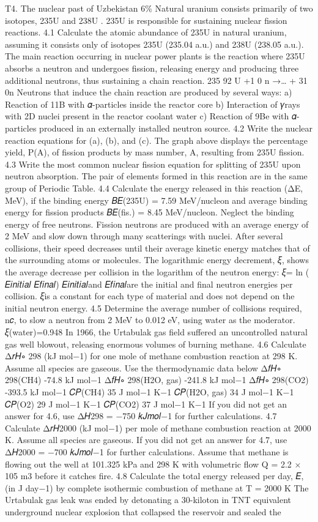 T4. The nuclear past of Uzbekistan 6\% Natural uranium consists primarily of two isotopes, 235U and 238U . 235U is responsible for sustaining nuclear fission reactions. 4.1 Calculate the atomic abundance of 235U in natural uranium, assuming it consists only of isotopes 235U (235.04 a.u.) and 238U (238.05 a.u.). The main reaction occurring in nuclear power plants is the reaction where 235U absorbs a neutron and undergoes fission, releasing energy and producing three additional neutrons, thus sustaining a chain reaction. 235 92 U +1 0 n →… + 31 0n Neutrons that induce the chain reaction are produced by several ways: a) Reaction of 11B with 𝛼-particles inside the reactor core b) Interaction of 𝛾rays with 2D nuclei present in the reactor coolant water c) Reaction of 9Be with 𝛼-particles produced in an externally installed neutron source. 4.2 Write the nuclear reaction equations for (a), (b), and (c). The graph above displays the percentage yield, P(A), of fission products by mass number, A, resulting from 235U fission. 4.3 Write the most common nuclear fission equation for splitting of 235U upon neutron absorption. The pair of elements formed in this reaction are in the same group of Periodic Table. 4.4 Calculate the energy released in this reaction (ΔE, MeV), if the binding energy 𝐵𝐸(235U) = 7.59 MeV/nucleon and average binding energy for fission products 𝐵𝐸(fis.) = 8.45 MeV/nucleon. Neglect the binding energy of free neutrons. Fission neutrons are produced with an average energy of 2 MeV and slow down through many scatterings with nuclei. After several collisions, their speed decreases until their average kinetic energy matches that of the surrounding atoms or molecules. The logarithmic energy decrement, 𝜉, shows the average decrease per collision in the logarithm of the neutron energy: 𝜉= ln ( 𝐸𝑖𝑛𝑖𝑡𝑖𝑎𝑙 𝐸𝑓𝑖𝑛𝑎𝑙) 𝐸𝑖𝑛𝑖𝑡𝑖𝑎𝑙and 𝐸𝑓𝑖𝑛𝑎𝑙are the initial and final neutron energies per collision. 𝜉is a constant for each type of material and does not depend on the initial neutron energy. 4.5 Determine the average number of collisions required, n𝑐, to slow a neutron from 2 MeV to 0.012 eV, using water as the moderator. 𝜉(water)=0.948 In 1966, the Urtabulak gas field suffered an uncontrolled natural gas well blowout, releasing enormous volumes of burning methane. 4.6 Calculate Δ𝑟𝐻∘ 298 (kJ mol−1) for one mole of methane combustion reaction at 298 K. Assume all species are gaseous. Use the thermodynamic data below Δ𝑓𝐻∘ 298(CH4) -74.8 kJ mol−1 Δ𝑓𝐻∘ 298(H2O, gas) -241.8 kJ mol−1 Δ𝑓𝐻∘ 298(CO2) -393.5 kJ mol−1 𝐶𝑃(CH4) 35 J mol−1 K−1 𝐶𝑃(H2O, gas) 34 J mol−1 K−1 𝐶𝑃(O2) 29 J mol−1 K−1 𝐶𝑃(CO2) 37 J mol−1 K−1 If you did not get an answer for 4.6, use Δ𝐻298 = −750 𝑘𝐽𝑚𝑜𝑙−1 for further calculations. 4.7 Calculate Δ𝑟𝐻2000 (kJ mol−1) per mole of methane combustion reaction at 2000 K. Assume all species are gaseous. If you did not get an answer for 4.7, use Δ𝐻2000 = −700 𝑘𝐽𝑚𝑜𝑙−1 for further calculations. Assume that methane is flowing out the well at 101.325 kPa and 298 K with volumetric flow Q = 2.2 × 105 m3 before it catches fire. 4.8 Calculate the total energy released per day, 𝐸, (in J day−1) by complete isothermic combustion of methane at T = 2000 K The Urtabulak gas leak was ended by detonating a 30-kiloton in TNT equivalent underground nuclear explosion that collapsed the reservoir and sealed the 
